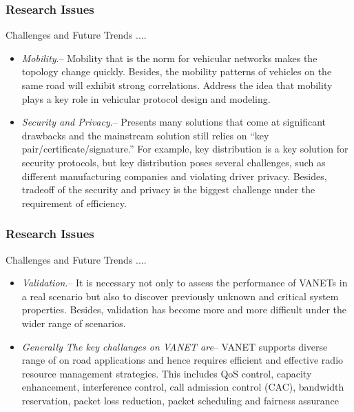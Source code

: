 \documentclass{beamer}
\begin{document}
\begin{frame}
	\frametitle{Research Issues}
	\begin{block}{Challenges and Future Trends .... }
		\begin{itemize}
			\item \textit{Mobility}.-- 
			Mobility that is the norm for vehicular networks makes the topology change quickly. Besides, the mobility patterns of vehicles on the same road will exhibit strong correlations. Address the idea that mobility plays a key role in vehicular protocol design and modeling.
			
			\item \textit{Security and Privacy}.-- 
			Presents many solutions that come at significant drawbacks and the mainstream solution still relies on “key pair/certificate/signature.” For example, key distribution is a key solution for security protocols, but key distribution poses several challenges, such as different manufacturing companies and violating driver privacy. 
			Besides, tradeoff of the security and privacy is the biggest challenge under the requirement of efficiency.
			
			
			
			
			
			
		\end{itemize}
	\end{block}
\end{frame}

\begin{frame}
	\frametitle{Research Issues}
	\begin{block}{Challenges and Future Trends .... }
		\begin{itemize}
			\item \textit{Validation}.-- 
			It is necessary not only to assess the performance of VANETs in a real scenario but also to discover previously unknown and critical system properties. Besides, validation has become more and more difficult under the wider range of scenarios.
			\item \textit{Generally The key challanges on VANET are}-- VANET  supports  diverse  range  of  on road  applications  and  hence  requires  efficient  and effective   radio   resource   management strategies.   This   includes   QoS   control,   capacity 
			enhancement,  interference  control,  call  admission  control  (CAC),  bandwidth  reservation, 
			packet  loss  reduction,  packet  scheduling  and  fairness  assurance
			
			
			
			
			
			
		\end{itemize}
	\end{block}
\end{frame}
\end{document}
